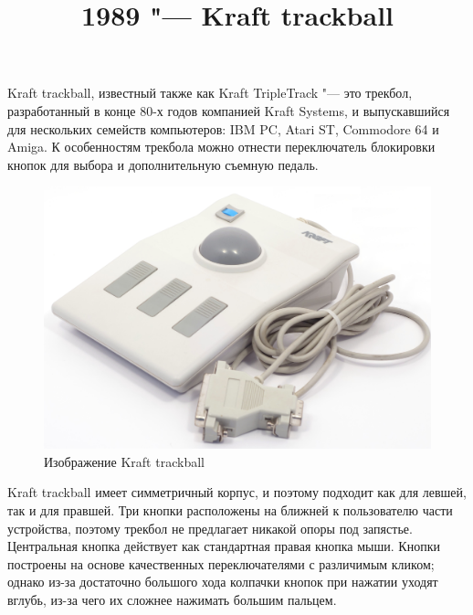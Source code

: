 \documentclass[11pt, a4paper]{article}
\begin{document}
\title{1989 "--- Kraft trackball}
\date{}
\maketitle

Kraft trackball, известный также как Kraft TripleTrack \cite{triple} "---	 это трекбол, разработанный в конце 80-х годов компанией Kraft Systems, и выпускавшийся для нескольких семейств компьютеров: IBM PC, Atari ST, Commodore 64 и Amiga. К особенностям трекбола можно отнести переключатель блокировки кнопок для выбора и дополнительную съемную педаль.

\begin{figure}[h]
    \centering
    \includegraphics[scale=0.4]{1989_kraft_trackball/pic_30.jpg}
    \caption{Изображение Kraft trackball}
    \label{fig:KraftPhoto}
\end{figure}

Kraft trackball имеет симметричный корпус, и поэтому подходит как для левшей, так и для правшей. Три кнопки расположены на ближней к пользователю части устройства, поэтому трекбол не предлагает никакой опоры под запястье. Центральная кнопка действует как стандартная правая кнопка мыши. Кнопки построены на основе качественных переключателями с различимым кликом; однако из-за достаточно большого хода колпачки кнопок при нажатии уходят вглубь, из-за чего их сложнее нажимать большим пальцем.
\end{document}
